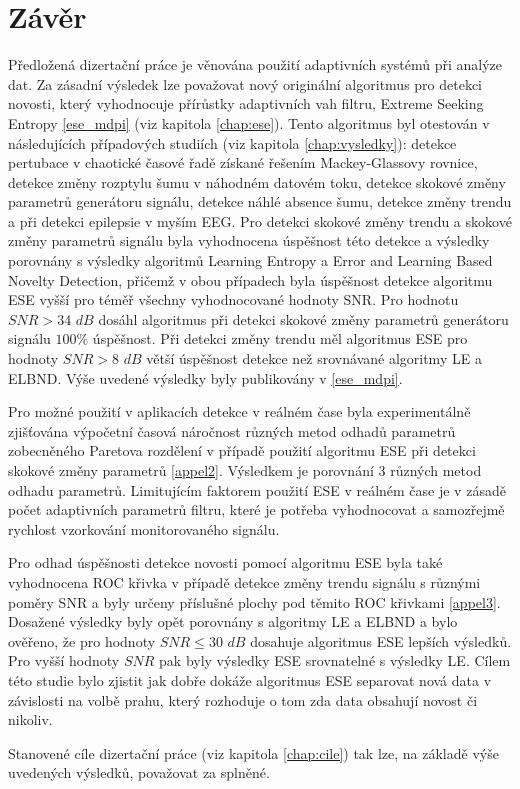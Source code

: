 \chapter{Závěr}
Předložená dizertační práce je věnována použití adaptivních systémů při analýze dat. Za zásadní výsledek lze považovat nový originální algoritmus pro detekci novosti, který vyhodnocuje přírůstky adaptivních vah filtru, Extreme Seeking Entropy \ref{ese_mdpi} (viz kapitola \ref{chap:ese}). Tento algoritmus byl otestován v následujících případových studiích (viz kapitola \ref{chap:vysledky}): detekce pertubace v chaotické časové řadě získané řešením Mackey-Glassovy rovnice, detekce změny rozptylu šumu v náhodném datovém toku, detekce skokové změny parametrů generátoru signálu, detekce náhlé absence šumu, detekce změny trendu a při detekci epilepsie v myším EEG. Pro detekci skokové změny trendu a skokové změny parametrů signálu byla vyhodnocena úspěšnost této detekce a výsledky porovnány s výsledky algoritmů Learning Entropy a Error and Learning Based Novelty Detection, přičemž v obou případech byla úspěšnost detekce algoritmu ESE vyšší pro téměř všechny vyhodnocované hodnoty SNR. Pro hodnotu $SNR>34$ $dB$ dosáhl algoritmus při detekci skokové změny parametrů generátoru signálu $100\%$ úspěšnost. Při detekci změny trendu měl algoritmus ESE pro hodnoty $SNR>8$ $dB$ větší úspěšnost detekce než srovnávané algoritmy LE a ELBND. Výše uvedené výsledky byly publikovány v \ref{ese_mdpi}.
\par Pro možné použití v aplikacích detekce v reálném čase byla experimentálně zjišťována výpočetní časová náročnost různých metod odhadů parametrů zobecněného Paretova rozdělení v případě použití algoritmu ESE při detekci skokové změny parametrů \ref{appel2}. Výsledkem je porovnání 3 různých metod odhadu parametrů. Limitujícím faktorem použití ESE v reálném čase je v zásadě počet adaptivních parametrů filtru, které je potřeba vyhodnocovat a samozřejmě rychlost vzorkování monitorovaného signálu.
\par Pro odhad úspěšnosti detekce novosti pomocí algoritmu ESE byla také vyhodnocena ROC křivka v případě detekce změny trendu signálu s různými poměry SNR a byly určeny příslušné plochy pod těmito ROC křivkami \ref{appel3}. Dosažené výsledky byly opět porovnány s algoritmy LE a ELBND a bylo ověřeno, že pro hodnoty $SNR \leq 30$ $dB$ dosahuje algoritmus ESE lepších výsledků. Pro vyšší hodnoty $SNR$ pak byly výsledky ESE srovnatelné s výsledky LE.  Cílem této studie bylo zjistit jak dobře dokáže algoritmus ESE separovat nová data v závislosti na volbě prahu, který rozhoduje o tom zda data obsahují novost či nikoliv.
\par
Stanovené cíle dizertační práce (viz kapitola \ref{chap:cile}) tak lze, na základě výše uvedených výsledků, považovat za splněné.

